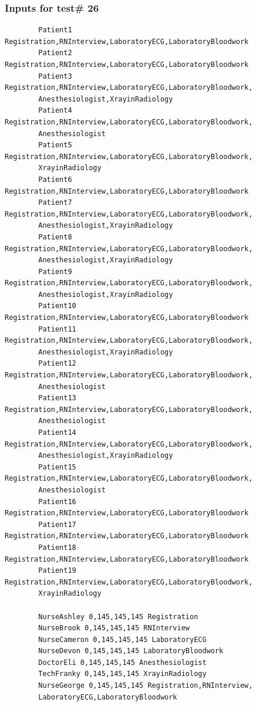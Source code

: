 \documentclass[12pt]{article}
\begin{document}
		\subsubsection{Inputs for test\# 26}
		\begin{verbatim}
		Patient1 Registration,RNInterview,LaboratoryECG,LaboratoryBloodwork
		Patient2 Registration,RNInterview,LaboratoryECG,LaboratoryBloodwork
		Patient3 Registration,RNInterview,LaboratoryECG,LaboratoryBloodwork,
		Anesthesiologist,XrayinRadiology
		Patient4 Registration,RNInterview,LaboratoryECG,LaboratoryBloodwork,
		Anesthesiologist
		Patient5 Registration,RNInterview,LaboratoryECG,LaboratoryBloodwork,
		XrayinRadiology
		Patient6 Registration,RNInterview,LaboratoryECG,LaboratoryBloodwork
		Patient7 Registration,RNInterview,LaboratoryECG,LaboratoryBloodwork,
		Anesthesiologist,XrayinRadiology
		Patient8 Registration,RNInterview,LaboratoryECG,LaboratoryBloodwork,
		Anesthesiologist,XrayinRadiology
		Patient9 Registration,RNInterview,LaboratoryECG,LaboratoryBloodwork,
		Anesthesiologist,XrayinRadiology
		Patient10 Registration,RNInterview,LaboratoryECG,LaboratoryBloodwork
		Patient11 Registration,RNInterview,LaboratoryECG,LaboratoryBloodwork,
		Anesthesiologist,XrayinRadiology
		Patient12 Registration,RNInterview,LaboratoryECG,LaboratoryBloodwork,
		Anesthesiologist
		Patient13 Registration,RNInterview,LaboratoryECG,LaboratoryBloodwork,
		Anesthesiologist
		Patient14 Registration,RNInterview,LaboratoryECG,LaboratoryBloodwork,
		Anesthesiologist,XrayinRadiology
		Patient15 Registration,RNInterview,LaboratoryECG,LaboratoryBloodwork,
		Anesthesiologist
		Patient16 Registration,RNInterview,LaboratoryECG,LaboratoryBloodwork
		Patient17 Registration,RNInterview,LaboratoryECG,LaboratoryBloodwork
		Patient18 Registration,RNInterview,LaboratoryECG,LaboratoryBloodwork
		Patient19 Registration,RNInterview,LaboratoryECG,LaboratoryBloodwork,
		XrayinRadiology
		
		NurseAshley 0,145,145,145 Registration
		NurseBrook 0,145,145,145 RNInterview
		NurseCameron 0,145,145,145 LaboratoryECG
		NurseDevon 0,145,145,145 LaboratoryBloodwork
		DoctorEli 0,145,145,145 Anesthesiologist
		TechFranky 0,145,145,145 XrayinRadiology
		NurseGeorge 0,145,145,145 Registration,RNInterview,
		LaboratoryECG,LaboratoryBloodwork
		\end{verbatim}
		
\end{document}
